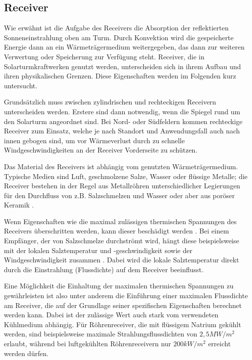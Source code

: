 \subsection{Receiver} \label{subsec_Receiver}

Wie erwähnt ist die Aufgabe des Receivers die Absorption der reflektierten Sonneneinstrahlung oben am Turm.
Durch Konvektion wird die gespeicherte Energie dann an ein Wärmeträgermedium weitergegeben, das dann zur weiteren Verwertung oder Speicherung zur Verfügung steht.
Receiver, die in Solarturmkraftwerken genutzt werden, unterscheiden sich in ihrem Aufbau und ihren physikalischen Grenzen. Diese Eigenschaften werden im Folgenden kurz untersucht.

Grundsätzlich muss zwischen zylindrischen und rechteckigen Receivern unterscheiden werden.
Erstere sind dann notwendig, wenn die Spiegel rund um den Solarturm angeordnet sind. Bei Nord- oder Südfeldern kommen rechteckige Receiver zum Einsatz, welche je nach Standort und Anwendungsfall auch nach innen gebogen sind, um vor Wärmeverlust durch zu schnelle Windgeschwindigkeiten an der Receiver Vorderseite zu schützen. \cite{Flesch}

Das Material des Receivers ist abhängig vom genutzten Wärmeträgermedium.
Typische Medien sind Luft, geschmolzene Salze, Wasser oder flüssige Metalle; die Receiver bestehen in der Regel aus Metallröhren unterschiedlicher Legierungen für den Durchfluss von z.B. Salzschmelzen und Wasser oder aber aus poröser Keramik \cite{Barlev}\cite{Ho2017}.

Wenn Eigenschaften wie die maximal zulässigen thermischen Spannungen des Receivers überschritten werden, kann dieser beschädigt werden \cite{AlbertoSanchez}.
Bei einem Empfänger, der von Salzschmelze durchströmt wird, hängt diese beispielsweise mit der lokalen Salztemperatur und -geschwindigkeit
sowie der Windgeschwindigkeit zusammen \cite{VantHull}.
Dabei wird die lokale Salztemperatur direkt durch die Einstrahlung (Flussdichte) auf dem Receiver beeinflusst.

Eine Möglichkeit die Einhaltung der maximalen thermischen Spannungen zu gewährleisten ist also unter anderem die Einführung einer maximalen Flussdichte am Receiver, die auf der Grundlage seiner spezifischen Eigenschaften berechnet werden kann.
Dabei ist der zulässige Wert auch stark vom verwendeten Kühlmedium abhängig.
Für Röhrenreceiver, die mit flüssigem Natrium gekühlt werden, sind beispielsweise maximale Strahlungsflussdichten von $2,5MW/m^2$ erlaubt, während bei luftgekühlten Röhrenreceivern nur $200kW/m^2$ \cite[S.17]{DissBelhomme} erreicht werden dürfen.

